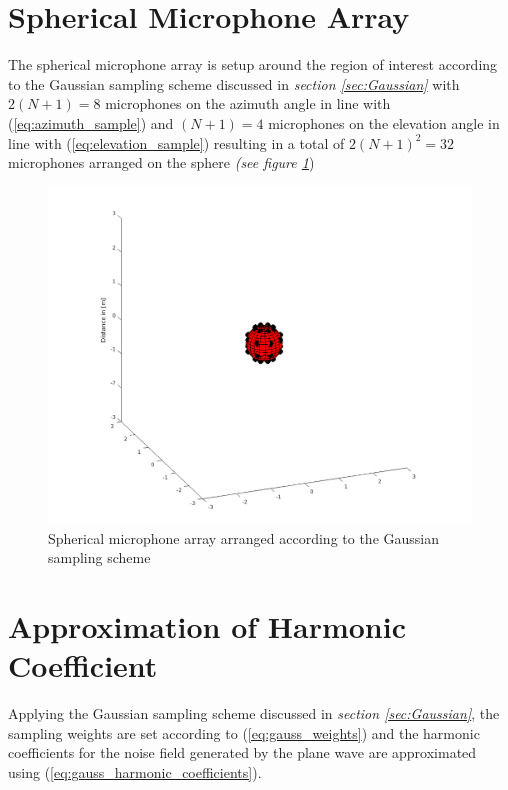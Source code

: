 \section{Spherical Microphone Array}\label{sec:ImplSphMic}
The spherical microphone array is setup around the region of interest according to the Gaussian sampling scheme discussed in \textit{section \ref{sec:Gaussian}} with $2(N+1) = 8$ microphones on the azimuth angle in line with (\ref{eq:azimuth_sample}) and $(N + 1) = 4$ microphones on the elevation angle in line with (\ref{eq:elevation_sample}) resulting in a total of $2(N + 1)^2 = 32$ microphones arranged on the sphere \textit{(see figure \ref{fig:MicrophoneArray}})
\begin{figure}[H]
    \centerline{\includegraphics[width=180mm,keepaspectratio]{LaTeX/images/plots/MicrophoneArray.png}}
    \caption{Spherical microphone array arranged according to the Gaussian sampling scheme}
    \label{fig:MicrophoneArray}
\end{figure}
\section{Approximation of Harmonic Coefficient}
Applying the Gaussian sampling scheme discussed in \textit{section \ref{sec:Gaussian}}, the sampling weights are set according to (\ref{eq:gauss_weights}) and the harmonic coefficients for the noise field generated by the plane wave are approximated using (\ref{eq:gauss_harmonic_coefficients}).



